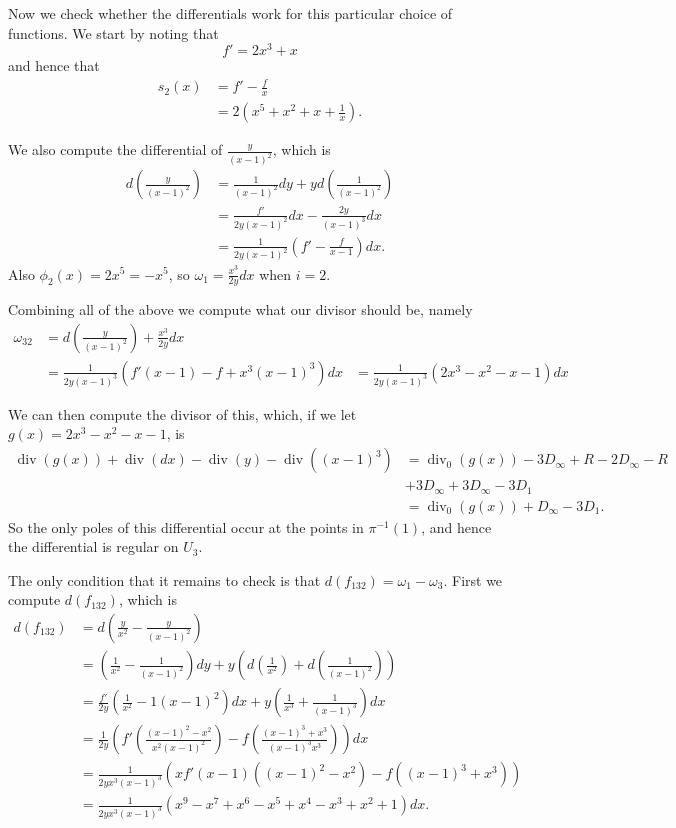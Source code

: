 \documentclass[draft, 11pt]{article} %
\theoremstyle{plain}
\theoremstyle{remark}
\DeclareMathOperator{\di}{div}
\begin{document}
Now we check whether the differentials work for this particular choice of functions.
We start by noting that 
\begin{equation*}
f' = 2x^3 + x
\end{equation*}
and hence that
\begin{align*}
s_2(x) & = f' - \frac{f}{x} \\
& = 2\left(x^5 + x^2 + x + \frac{1}{x} \right).
\end{align*}

We also compute the differential of $\frac{y}{(x-1)^2}$, which is
\begin{align*}
d\left( \frac{y}{(x-1)^2} \right) & = \frac{1}{(x-1)^2}dy + y d \left( \frac{1}{(x-1)^2} \right) \\
& = \frac{f'}{2y(x-1)^2}dx - \frac{2y}{(x-1)^3}dx \\
& = \frac{1}{2y(x-1)^2} \left( f' - \frac{f}{x-1} \right) dx.
\end{align*}
Also $\phi_2(x) = 2x^5 = -x^5$, so $\omega_1 = \frac{x^3}{2y}dx$ when $i=2$.


Combining all of the above we compute what our divisor should be, namely
\begin{align*}
\omega_{32} &  = d\left( \frac{y}{(x-1)^2} \right) + \frac{x^3}{2y}dx \\
& = \frac{1}{2y(x-1)^3} \left( f'(x-1) - f + x^3(x-1)^3 \right) dx
& = \frac{1}{2y(x-1)^3}(2x^3-x^2-x-1)dx
\end{align*}
 
We can then compute the divisor of this, which, if we let $g(x) = 2x^3 - x^2 -x -1$, is
\begin{align*}
\di(g(x)) + \di( dx) - \di (y) - \di ((x-1)^3)  & =  \di_0(g(x)) - 3D_\infty + R - 2D_\infty - R  \\
& + 3D_\infty + 3D_\infty - 3D_1 \\
 & =  \di_0(g(x)) + D_\infty - 3D_1.
\end{align*}
So the only poles of this differential occur at the points in $\pi^{-1}(1)$, and hence the differential is regular on $U_3$.

The only condition that it remains to check is that $d(f_{132}) = \omega_1 - \omega_3$.
First we compute $d(f_{132})$, which is
\begin{align*}
d(f_{132})  & =  d \left( \frac{y}{x^2} - \frac{y}{(x-1)^2} \right) \\
& =  \left( \frac{1}{x^2} - \frac{1}{(x-1)^2} \right) dy + y \left( d \left( \frac{1}{x^2} \right) + d \left( \frac{1}{(x-1)^2} \right) \right) \\
&=  \frac{f'}{2y} \left( \frac{1}{x^2} - {1}{(x-1)^2} \right) dx + y \left( \frac{1}{x^3} + \frac{1}{(x-1)^3} \right) dx \\
&=  \frac{1}{2y} \left( f'\left( \frac{(x-1)^2 - x^2}{x^2(x-1)^2} \right) - f \left( \frac{(x-1)^3 + x^3}{(x-1)^3x^3} \right) \right) dx \\
&=  \frac{1}{2yx^3(x-1)^3} ( xf'(x-1)((x-1)^2-x^2) - f((x-1)^3 + x^3) ) \\
&=  \frac{1}{2yx^3(x-1)^3} (x^9 - x^7 + x^6 - x^5 + x^4 - x^3 + x^2 + 1)dx.
\end{align*}





\end{document}
